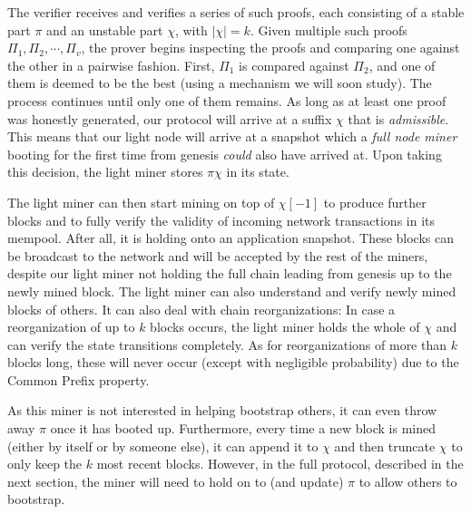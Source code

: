 The verifier receives and verifies a series of such proofs,
each consisting of a stable part $\pi$ and an unstable part $\chi$,
with $|\chi| = k$.
Given multiple such proofs $\Pi_1, \Pi_2, \cdots, \Pi_v$,
the prover begins inspecting the proofs and comparing one against the other
in a pairwise fashion. First, $\Pi_1$ is compared against $\Pi_2$,
and one of them is deemed to be the best (using a mechanism we will soon study).
The process continues until only one of them remains. As long as at least
one proof was honestly generated, our protocol will arrive at a suffix $\chi$
that is \emph{admissible}. This means that our light node will arrive at a snapshot
which a \emph{full node miner} booting for the first time from genesis \emph{could} also
have arrived at. Upon taking this decision, the light miner stores $\pi\chi$ in its state.

The light miner can then start mining on top of $\chi[-1]$ to produce further blocks
and to fully verify the validity of incoming network transactions in its mempool.
After all, it is holding onto an application snapshot. These blocks can
be broadcast to the network and will be accepted by the rest of the miners, despite
our light miner not holding the full chain leading from genesis up to the newly mined
block. The light miner can also understand and verify newly mined blocks of others.
It can also deal with chain reorganizations: In case a reorganization of up to $k$
blocks occurs, the light miner holds the whole of $\chi$ and can verify the
state transitions completely. As for reorganizations of more than $k$ blocks long, these
will never occur (except with negligible probability) due to the Common Prefix
property.

As this miner is not interested in helping bootstrap others, it can even throw away
$\pi$ once it has booted up. Furthermore, every time a new block is mined (either by
itself or by someone else), it can append it to $\chi$ and then truncate $\chi$ to only
keep the $k$ most recent blocks. However, in the full protocol, described in the
next section, the miner will need to hold on to (and update) $\pi$ to allow others
to bootstrap.

